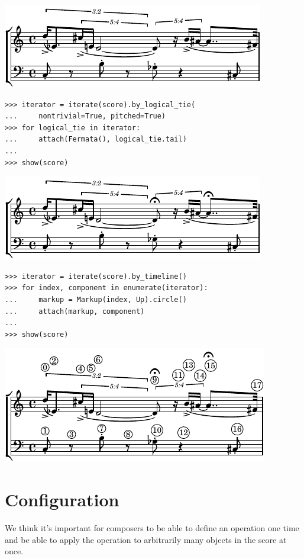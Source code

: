 \documentclass{article}
\begin{document}
\noindent\includegraphics[scale=1.0]{images/abjad-9.pdf}


\begin{lstlisting}
>>> iterator = iterate(score).by_logical_tie(
...     nontrivial=True, pitched=True)
>>> for logical_tie in iterator:
...     attach(Fermata(), logical_tie.tail)
... 
>>> show(score)
\end{lstlisting}

\noindent\includegraphics[scale=1.0]{images/abjad-10.pdf}


\begin{lstlisting}
>>> iterator = iterate(score).by_timeline()
>>> for index, component in enumerate(iterator):
...     markup = Markup(index, Up).circle()
...     attach(markup, component)
... 
>>> show(score)
\end{lstlisting}

\noindent\includegraphics[scale=1.0]{images/abjad-11.pdf}


\section{Configuration}

We think it's important for composers to be able to define an operation one
time and be able to apply the operation to arbitrarily many objects in the
score at once.
\end{document}
